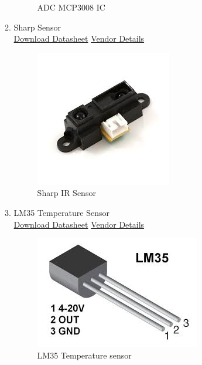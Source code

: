 \documentclass[a4paper,12pt,oneside]{book}
\begin{document}
\begin{itemize}
\begin{enumerate}
\begin{figure}[H]
        \caption{ADC MCP3008 IC}
      \end{figure}
      \item Sharp Sensor      \\
      \href{www.sharpsma.com/webfm_send/1208} {Download Datasheet}
      \href{http: //www.ebay.in/itm/262401450416?aff_source=Sok-Goog} {Vendor Details}
      \begin{figure}[H]
        \centering
        \includegraphics[scale=0.6]{sharp}
        \caption{Sharp IR Sensor}
      \end{figure}
      \item LM35 Temperature Sensor    \\
      \href{www.ti.com/lit/ds/symlink/lm35.pdf} {Download Datasheet}
      \href{http://www.amazon.in/Robo-India-Temperature-Sensor-LM35/dp/B00WO5AFPE} {Vendor Details}
      \begin{figure}[H]
        \centering
        \includegraphics[scale=0.6]{lm35}
        \caption{LM35 Temperature sensor}
      \end{figure}
      

\end{enumerate}
\end{itemize}
\end{document}
